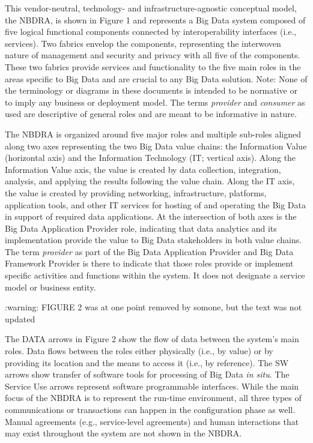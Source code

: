\documentclass[9pt,]{article}
\newenvironment{Shaded}{}{}
\newcommand{\ExtensionTok}[1]{#1}
\newcommand{\NormalTok}[1]{#1}
\begin{document}
This vendor-neutral, technology- and infrastructure-agnostic conceptual
model, the NBDRA, is shown in Figure 1 and represents a Big Data system
composed of five logical functional components connected by
interoperability interfaces (i.e., services). Two fabrics envelop the
components, representing the interwoven nature of management and
security and privacy with all five of the components. These two fabrics
provide services and functionality to the five main roles in the areas
specific to Big Data and are crucial to any Big Data solution. Note:
None of the terminology or diagrams in these documents is intended to be
normative or to imply any business or deployment model. The terms
\emph{provider} and \emph{consumer} as used are descriptive of general
roles and are meant to be informative in nature.

The NBDRA is organized around five major roles and multiple sub-roles
aligned along two axes representing the two Big Data value chains: the
Information Value (horizontal axis) and the Information Technology (IT;
vertical axis). Along the Information Value axis, the value is created
by data collection, integration, analysis, and applying the results
following the value chain. Along the IT axis, the value is created by
providing networking, infrastructure, platforms, application tools, and
other IT services for hosting of and operating the Big Data in support
of required data applications. At the intersection of both axes is the
Big Data Application Provider role, indicating that data analytics and
its implementation provide the value to Big Data stakeholders in both
value chains. The term \emph{provider} as part of the Big Data
Application Provider and Big Data Framework Provider is there to
indicate that those roles provide or implement specific activities and
functions within the system. It does not designate a service model or
business entity.

\begin{Shaded}
\begin{Highlighting}[]
\NormalTok{:}\ExtensionTok{warning}\NormalTok{: FIGURE 2 was at one point removed by somone, but the text was not updated}
\end{Highlighting}
\end{Shaded}

The DATA arrows in Figure 2 show the flow of data between the system's
main roles. Data flows between the roles either physically (i.e., by
value) or by providing its location and the means to access it (i.e., by
reference). The SW arrows show transfer of software tools for processing
of Big Data \emph{in situ}. The Service Use arrows represent software
programmable interfaces. While the main focus of the NBDRA is to
represent the run-time environment, all three types of communications or
transactions can happen in the configuration phase as well. Manual
agreements (e.g., service-level agreements) and human interactions that
may exist throughout the system are not shown in the NBDRA.
\end{document}
